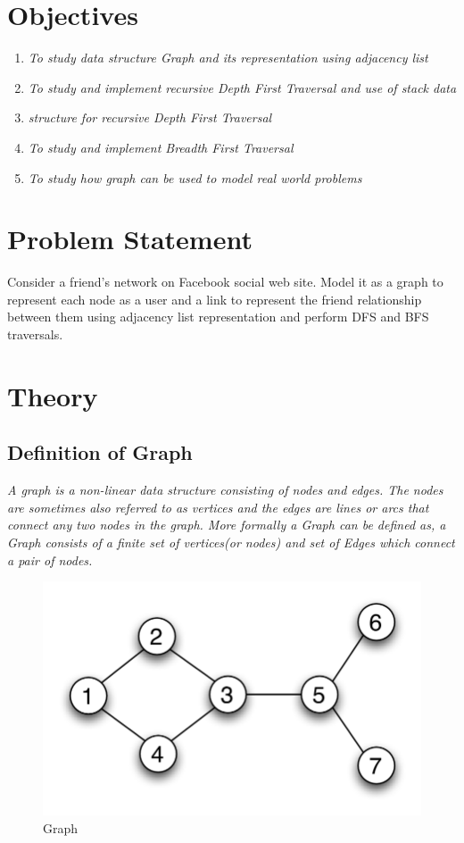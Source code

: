 \documentclass[11pt]{article}
\begin{document}
\tableofcontents
\thispagestyle{empty}
\clearpage

\setcounter{page}{1}

\section{Objectives}
\begin{enumerate}
    \item \textit{To study data structure Graph and its representation using adjacency list}
    \item \textit{To study and implement recursive Depth First Traversal and use of stack data}
    \item \textit{structure for recursive Depth First Traversal}
    \item \textit{To study and implement Breadth First Traversal}
    \item \textit{To study how graph can be used to model real world problems}
\end{enumerate}

\section{Problem Statement}
Consider a friend's network on Facebook social web site. Model it as a graph to represent each
node as a user and a link to represent the friend relationship between them using adjacency list
representation and perform DFS and BFS traversals.

\section{Theory}

\subsection{Definition of Graph}

\textit{A graph is a non-linear data structure consisting of nodes and edges. The nodes are sometimes also referred to as vertices and the edges are lines or arcs that connect any two nodes in the graph. More formally a Graph can be defined as, a Graph consists of a finite set of vertices(or nodes) and set of Edges which connect a pair of nodes.}

\begin{figure}[H]
    \centering
    \includegraphics[width=.45\textwidth]{figures/undirected graph.png}
    \caption{Graph}
\end{figure}
\end{document}
